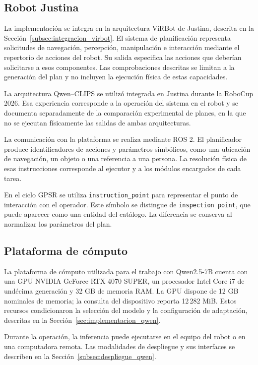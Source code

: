 \subsection{Robot Justina}

La implementación se integra en la arquitectura ViRBot de Justina,
descrita en la Sección~\ref{subsec:integracion_virbot}. El sistema de
planificación representa solicitudes de navegación, percepción,
manipulación e interacción mediante el repertorio de acciones del robot.
Su salida especifica las acciones que deberían solicitarse a esos
componentes. Las comprobaciones descritas se limitan a la generación
del plan y no incluyen la ejecución física de estas capacidades.

La arquitectura Qwen--CLIPS se utilizó integrada en Justina durante
la RoboCup 2026. Esa experiencia corresponde a la operación del
sistema en el robot y se documenta separadamente de la comparación
experimental de planes, en la que no se ejecutan físicamente las
salidas de ambas arquitecturas.

La comunicación con la plataforma se realiza mediante ROS 2. El
planificador produce identificadores de acciones y parámetros simbólicos,
como una ubicación de navegación, un objeto o una referencia a una persona.
La resolución física de esas instrucciones corresponde al ejecutor y a los
módulos encargados de cada tarea.

En el ciclo GPSR se utiliza \texttt{instruction\_\allowbreak point} para representar
el punto de interacción con el operador. Este símbolo se distingue de
\texttt{inspection point}, que puede aparecer como una entidad del
catálogo. La diferencia se conserva al normalizar los parámetros del plan.

\subsection{Plataforma de cómputo}
\label{subsec:plataforma_computo}

La plataforma de cómputo utilizada para el trabajo con Qwen2.5-7B cuenta
con una GPU NVIDIA GeForce RTX 4070 SUPER, un procesador Intel Core i7
de undécima generación y 32 GB de memoria RAM. La GPU dispone de 12 GB
nominales de memoria; la consulta del dispositivo reporta 12\,282 MiB.
Estos recursos condicionaron la selección del modelo y la configuración
de adaptación, descritas en la Sección~\ref{sec:implementacion_qwen}.

Durante la operación, la inferencia puede ejecutarse en el equipo del
robot o en una computadora remota. Las modalidades de despliegue y sus
interfaces se describen en la Sección~\ref{subsec:despliegue_qwen}.

